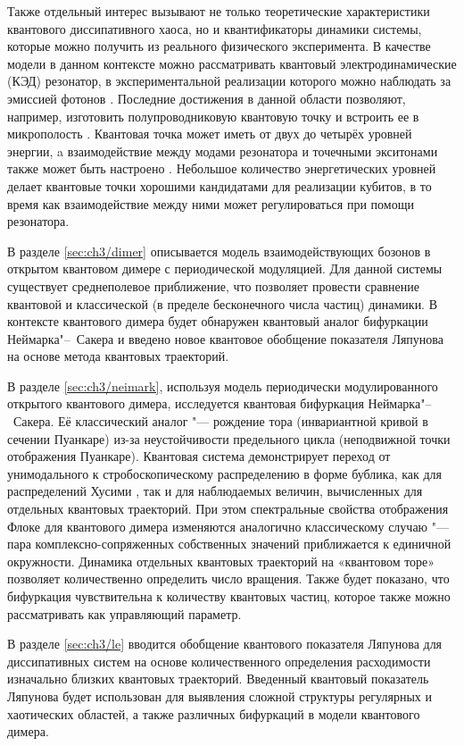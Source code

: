 Также отдельный интерес вызывают не только теоретические характеристики квантового диссипативного хаоса, но и квантификаторы динамики системы, которые можно получить из реального физического эксперимента. 
В качестве модели в данном контексте можно рассматривать  квантовый электродинамические (КЭД) резонатор, в экспериментальной реализации которого можно наблюдать за эмиссией фотонов \cite{Walther2006, Arakawa2015}.
Последние достижения в данной области позволяют, например, изготовить полупроводниковую квантовую точку и встроить ее в микрополость \cite{Arakawa2015}. 
Квантовая точка может иметь от двух до четырёх уровней энергии, a взаимодействие между модами резонатора и точечными экситонами также может быть настроено \cite{Reithmaier2004, Hennessy2007}. 
Небольшое количество энергетических уровней делает квантовые точки хорошими кандидатами для реализации кубитов, в то время как взаимодействие между ними может регулироваться при помощи резонатора.

В разделе \cref{sec:ch3/dimer} описывается модель взаимодействующих бозонов в открытом квантовом димере с периодической модуляцией. Для данной системы существует среднеполевое приближение, что позволяет провести сравнение квантовой и классической (в пределе бесконечного числа частиц) динамики. В контексте квантового димера будет обнаружен квантовый аналог бифуркации Неймарка"--~Сакера и введено новое квантовое обобщение показателя Ляпунова на основе метода квантовых траекторий.

В разделе \cref{sec:ch3/neimark}, используя модель периодически модулированного открытого квантового димера, исследуется квантовая бифуркация Неймарка"--~Сакера. 
Её классический аналог "--- рождение тора (инвариантной кривой в сечении Пуанкаре) из-за неустойчивости предельного цикла (неподвижной точки отображения Пуанкаре).
Квантовая система демонстрирует переход от унимодального к стробоскопическому распределению в форме бублика, как для распределений Хусими \cite{Stockmann2006}, так и для наблюдаемых величин, вычисленных для отдельных квантовых траекторий. 
При этом спектральные свойства отображения Флоке для квантового димера изменяются аналогично классическому случаю "---  пара комплексно-сопряженных собственных значений приближается к единичной окружности. 
Динамика отдельных квантовых траекторий на «квантовом торе» позволяет количественно определить число вращения.
Также будет показано, что бифуркация чувствительна к количеству квантовых частиц, которое также можно рассматривать как управляющий параметр.

В разделе \cref{sec:ch3/le} вводится обобщение квантового показателя Ляпунова для диссипативных систем на основе количественного определения расходимости изначально близких квантовых траекторий.
Введенный квантовый показатель Ляпунова будет использован для выявления сложной структуры регулярных и хаотических областей, а также различных бифуркаций в модели квантового димера.


